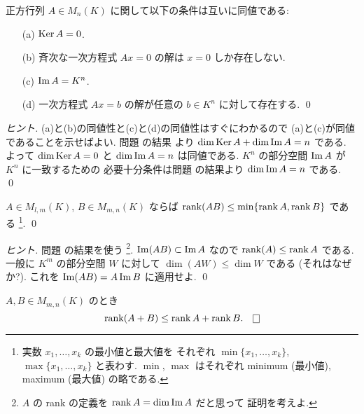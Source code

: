 \documentclass[12pt,twoside]{jarticle}
\begin{document}

\begin{question}
  \label{q:nulity+rank=n=m}
  正方行列 $A\in M_n(K)$ に関して以下の条件は互いに同値である:
  \begin{enumerate}
  \item[(a)] $\mathop{\mathrm{Ker}}\nolimits A = 0$.  
  \item[(b)] 斉次な一次方程式 $Ax=0$ の解は $x=0$ しか存在しない.
  \item[(c)] $\mathop{\mathrm{Im}}\nolimits A = K^n$. 
  \item[(d)] 一次方程式 $Ax=b$ の解が任意の $b\in K^n$ に対して存在する.
    \qed
  \end{enumerate}
\end{question}

\begin{proof}[ヒント]
  (a)と(b)の同値性と(c)と(d)の同値性はすぐにわかるので
  (a)と(c)が同値であることを示せばよい.
  問題  の結果
  より $\dim\mathop{\mathrm{Ker}}\nolimits A+\dim\mathop{\mathrm{Im}}\nolimits A = n$ である.
  よって $\dim\mathop{\mathrm{Ker}}\nolimits A = 0$ と $\dim\mathop{\mathrm{Im}}\nolimits A = n$ は同値である.
  $K^n$ の部分空間 $\mathop{\mathrm{Im}}\nolimits A$ が $K^n$ に一致するための
  必要十分条件は問題  の結果より $\dim\mathop{\mathrm{Im}}\nolimits A=n$ である.
  \qed
\end{proof}


\begin{question}
  $A\in M_{l,m}(K)$, $B\in M_{m,n}(K)$ 
  ならば $\mathop{\mathrm{rank}}\nolimits(AB) \le \min\{\mathop{\mathrm{rank}}\nolimits A, \mathop{\mathrm{rank}}\nolimits B\}$ である%
  \footnote{実数 $x_1,\ldots,x_k$ の最小値と最大値を
    それぞれ $\min\{x_1,\ldots,x_k\}$, $\max\{x_1,\ldots,x_k\}$ と表わす.
    $\min$, $\max$ はそれぞれ minimum (最小値), maximum (最大値) の略である.}.
  \qed
\end{question}

\begin{proof}[ヒント]
  問題  の結果を使う%
  \footnote{$A$ の rank の定義を $\mathop{\mathrm{rank}}\nolimits A = \dim\mathop{\mathrm{Im}}\nolimits A$ だと思って
    証明を考えよ.}.
  $\mathop{\mathrm{Im}}\nolimits(AB)\subset\mathop{\mathrm{Im}}\nolimits A$ なので $\mathop{\mathrm{rank}}\nolimits(A)\le\mathop{\mathrm{rank}}\nolimits A$ である.
  一般に $K^m$ の部分空間 $W$ に対して $\dim(AW)\le\dim W$ である
  (それはなぜか?).  これを $\mathop{\mathrm{Im}}\nolimits(AB)=A\mathop{\mathrm{Im}}\nolimits B$ に適用せよ.
  \qed
\end{proof}


\begin{question}
  $A,B\in M_{m,n}(K)$ のとき
  \begin{equation*}
    \rank(A+B) \le \rank A + \rank B. \qed
  \end{equation*}
\end{question}
\end{document}
